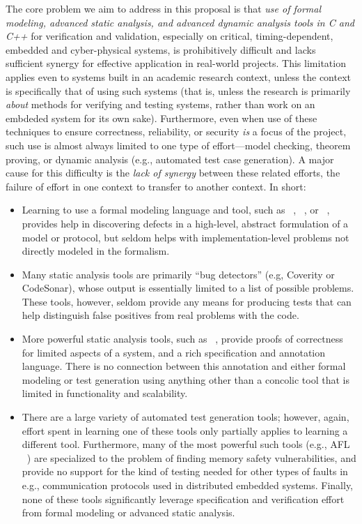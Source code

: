 The core problem we aim to address in this proposal is that \emph{use of formal modeling, advanced static analysis, and advanced dynamic analysis tools in C and C++} for verification and validation, especially on critical, timing-dependent, embedded and cyber-physical systems, is prohibitively difficult and lacks sufficient synergy for effective application in real-world projects.  This limitation applies even to systems built in an academic research context, unless the context is specifically that of using such systems (that is, unless the research is primarily \emph{about} methods for verifying and testing systems, rather than work on an embdeded system for its own sake).  Furthermore, even when use of these techniques to ensure correctness, reliability, or security \emph{is} a focus of the project, such use is almost always limited to one type of effort---model checking, theorem proving, or dynamic analysis (e.g., automated test case generation).  A major cause for this difficulty is the \emph{lack of synergy} between these related efforts, the failure of effort in one context to transfer to another context.  In short:

\begin{itemize}[labelsep=3pt,leftmargin=12pt]
\item Learning to use a formal modeling language and tool, such as \uppaal~\cite{uppaal}, \prism~\cite{KNP2011:CAV}, or \spin~\cite{SPIN}, provides help in discovering defects in a high-level, abstract formulation of a model or protocol, but seldom helps with implementation-level problems not directly modeled in the formalism.
\item Many static analysis tools are primarily ``bug detectors'' (e.g, Coverity or CodeSonar), whose output is essentially limited to a list of possible problems.  These tools, however, seldom provide any means for producing tests that can help distinguish false positives from real problems with the code.
\item More powerful static analysis tools, such as \framac~\cite{KKP2015:FAC}, provide proofs of correctness for limited aspects of a system, and a rich specification and annotation language.  There is no connection between this annotation and either formal modeling or test generation using anything other than a concolic tool that is limited in functionality and scalability.
\item There are a large variety of automated test generation tools; however, again, effort spent in learning one of these tools only partially applies to learning a different tool.  Furthermore, many of the most powerful such tools (e.g., AFL ~\cite{aflfuzz}) are specialized to the problem of finding memory safety vulnerabilities, and provide no support for  the kind of testing needed for  other types of faults in e.g., communication protocols used in distributed embedded systems.  Finally, none of these tools significantly leverage specification and verification effort from formal modeling or advanced static analysis.
\end{itemize}

